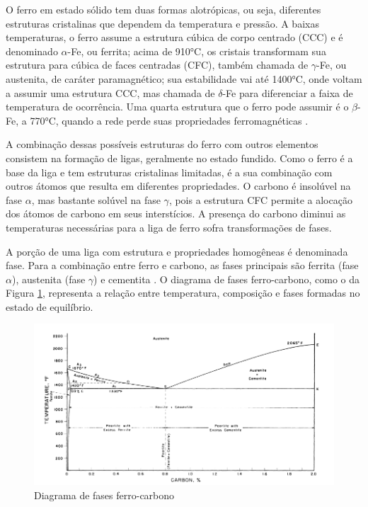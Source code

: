 \documentclass[brazil,dissertacao,epusp]{usp}
\begin{document}
O ferro em estado sólido tem duas formas alotrópicas, ou seja, diferentes estruturas cristalinas que dependem da temperatura e pressão. A baixas temperaturas, o ferro assume a estrutura cúbica de corpo centrado (CCC) e é denominado $\alpha$-Fe, ou ferrita; acima de 910°C, os cristais transformam sua estrutura para cúbica de faces centradas (CFC), também chamada de $\gamma$-Fe, ou austenita, de caráter paramagnético; sua estabilidade vai até 1400°C, onde voltam a assumir uma estrutura CCC, mas chamada de $\delta$-Fe para diferenciar a faixa de temperatura de ocorrência.  Uma quarta estrutura que o ferro pode assumir é o $\beta$-Fe, a 770°C, quando a rede perde suas propriedades ferromagnéticas \cite{Totten2006}.

A combinação dessas possíveis estruturas do ferro com outros elementos consistem na formação de ligas, geralmente no estado fundido. Como o ferro é a base da liga e tem estruturas cristalinas limitadas, é a sua combinação com outros átomos que resulta em diferentes propriedades. O carbono é insolúvel na fase $\alpha$, mas bastante solúvel na fase $\gamma$, pois a estrutura CFC permite a alocação dos átomos de carbono em seus interstícios. A presença do carbono diminui as temperaturas necessárias para a liga de ferro sofra transformações de fases.

A porção de uma liga com estrutura e propriedades homogêneas é denominada fase. Para a combinação entre ferro e carbono, as fases principais são ferrita (fase $\alpha$), austenita (fase $\gamma$) e cementita \cite{Dossett2006}. O diagrama de fases ferro-carbono, como o da Figura \ref{fig:diagrama_fe-cementita}, representa a relação entre temperatura, composição e fases formadas no estado de equilíbrio.

\begin{figure}
  \includegraphics[width=.9\textwidth]{img/ferrocarbono-digges.png}
  \caption{Diagrama de fases ferro-carbono \cite{Digges1960}}
  \label{fig:diagrama_fe-cementita}
\end{figure}
\end{document}
